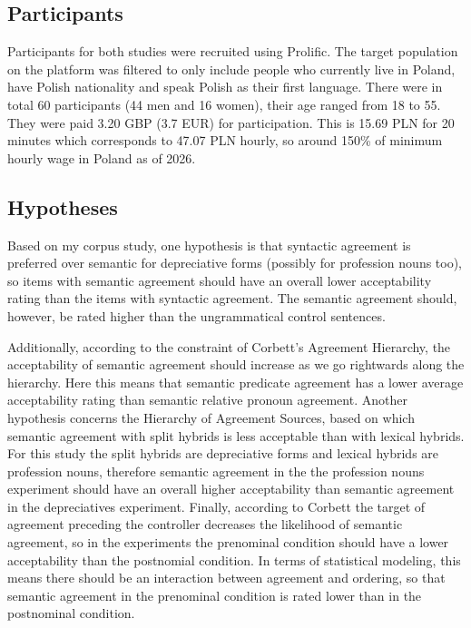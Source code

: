 \subsection{Participants}
Participants for both studies were recruited using Prolific. The target population on the platform was filtered to only include people who currently live in Poland, have Polish nationality and speak Polish as their first language. There were in total 60 participants (44 men and 16 women), their age ranged from 18 to 55. They were paid 3.20 GBP (3.7 EUR) for participation. This is 15.69 PLN for 20 minutes which corresponds to 47.07 PLN hourly, so around 150\% of minimum hourly wage in Poland as of 2026. 

\subsection{Hypotheses}
Based on my corpus study, one hypothesis is that syntactic agreement is preferred over semantic for depreciative forms (possibly for profession nouns too), so items with semantic agreement should have an overall lower acceptability rating than the items with syntactic agreement. The semantic agreement should, however, be rated higher than the ungrammatical control sentences.

Additionally, according to the constraint of Corbett's Agreement Hierarchy, the acceptability of semantic agreement should increase as we go rightwards along the hierarchy. Here this means that semantic predicate agreement has a lower average acceptability rating than semantic relative pronoun agreement. Another hypothesis concerns the Hierarchy of Agreement Sources, based on which semantic agreement with split hybrids is less acceptable than with lexical hybrids. For this study the split hybrids are depreciative forms and lexical hybrids are profession nouns, therefore semantic agreement in the the profession nouns experiment should have an overall higher acceptability than semantic agreement in the depreciatives experiment. Finally, according to Corbett the target of agreement preceding the controller decreases the likelihood of semantic agreement, so in the experiments the prenominal condition should have a lower acceptability than the postnomial condition. In terms of statistical modeling, this means there should be an interaction between agreement and ordering, so that semantic agreement in the prenominal condition is rated lower than in the postnominal condition.

\vfill
